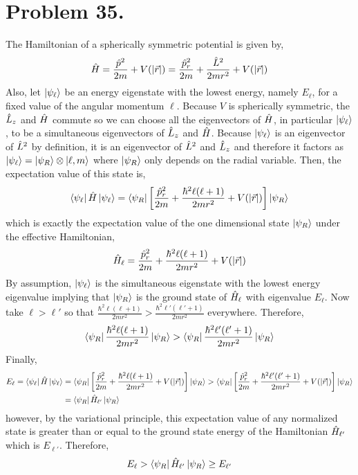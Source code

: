 \documentclass[12pt]{extarticle}
\begin{document}
 
\section*{Problem 35.}
The Hamiltonian of a spherically symmetric potential is given by,
\[\hat{H} = \frac{\hat{p}^2}{2m} + V(|\vec{r}|) = \frac{\hat{p}_r^2}{2m} + \frac{\hat{L}^2}{2mr^2} + V(|\vec{r}|)\]
Also, let $\left| \psi_\ell \right>$ be an energy eigenstate with the lowest energy, namely $E_\ell$, for a fixed value of the angular momentum $\ell$. Because $V$ is spherically symmetric, the $\hat{L}_z$ and $\hat{H}$ commute so we can choose all the eigenvectors of $\hat{H}$, in particular $\left| \psi_\ell \right>$, to be a simultaneous eigenvectors of $\hat{L}_z$ and $\hat{H}$. Because $\left| \psi_\ell \right>$ is an eigenvector of $\hat{L}^2$ by definition, it is an eigenvector of $\hat{L}^2$ and $\hat{L}_z$ and therefore it factors as $\left| \psi_\ell \right> = \left| \psi_R \right> \otimes \left| \ell, m \right>$ where $\left| \psi_R \right>$ only depends on the radial variable. Then, the expectation value of this state is,
\[\left< \psi_\ell \right| \hat{H} \left| \psi_\ell \right> = \left< \psi_R \right| \left[ \frac{\hat{p}_r^2}{2m} + \frac{\hbar^2 \ell (\ell + 1) }{2mr^2} + V(|\vec{r}|) \right] \left| \psi_R \right>\]
which is exactly the expectation value of the one dimensional state $\left| \psi_R \right>$ under the effective Hamiltonian,
\[\hat{H}_\ell = \frac{\hat{p}_r^2}{2m} + \frac{\hbar^2 \ell (\ell + 1) }{2mr^2} + V(|\vec{r}|)\]
By assumption, $\left| \psi_\ell \right>$ is the simultaneous eigenstate with the lowest energy eigenvalue implying that $\left| \psi_R \right>$ is the ground state of $\hat{H}_\ell$ with eigenvalue $E_\ell$. Now take $\ell > \ell'$ so that $\frac{\hbar^2 \ell (\ell + 1)}{2mr^2} > \frac{\hbar^2 \ell' (\ell' + 1)}{2mr^2}$ everywhere. Therefore,
\[\left< \psi_R \right| \frac{\hbar^2 \ell (\ell + 1)}{2mr^2} \left| \psi_R \right> > \left< \psi_R \right| \frac{\hbar^2 \ell' (\ell' + 1)}{2mr^2} \left| \psi_R \right> \]
Finally, 
\begin{align*}
E_\ell = \left< \psi_\ell \right| \hat{H} \left| \psi_\ell \right> & = \left< \psi_R \right| \left[ \frac{\hat{p}_r^2}{2m} + \frac{\hbar^2 \ell (\ell + 1) }{2mr^2} + V(|\vec{r}|) \right] \left| \psi_R \right> > \left< \psi_R \right| \left[ \frac{\hat{p}_r^2}{2m} + \frac{\hbar^2 \ell' (\ell' + 1) }{2mr^2} + V(|\vec{r}|) \right] \left| \psi_R \right> \\ & = \left< \psi_R \right| \hat{H}_{\ell'} \left| \psi_R \right> 
\end{align*} 
however, by the variational principle, this expectation value of any normalized state is greater than or equal to the ground state energy of the Hamiltonian $\hat{H}_{\ell'}$ which is $E_{\ell'}$. Therefore,
\[E_\ell >  \left< \psi_R \right| \hat{H}_{\ell'} \left| \psi_R \right>  \ge E_{\ell'}\] 
\end{document}
